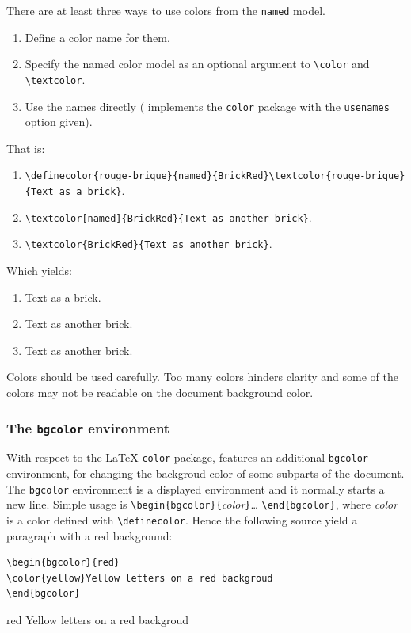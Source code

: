 There are at least three ways to use colors from the \texttt{named}
 model.
\begin{enumerate}
\item Define a color name for them.
\item Specify the named color model as an optional argument to
 \verb+\color+ and \verb+\textcolor+.
\item Use the names directly
(\hevea{} implements the \texttt{color} package with
the \texttt{usenames} option given).
\end{enumerate}
That is:
\begin{enumerate}
\item
\verb+\definecolor{rouge-brique}{named}{BrickRed}\textcolor{rouge-brique}{Text as a brick}+.
\item \verb+\textcolor[named]{BrickRed}{Text as another brick}+.
\item \verb+\textcolor{BrickRed}{Text as another brick}+.
\end{enumerate}
\ifhevea Which yields:
\begin{enumerate}
\item {}
\textcolor{rouge-brique}{Text as a brick}.
\item \textcolor[named]{BrickRed}{Text as another brick}.
\item \textcolor{BrickRed}{Text as another brick}.
\end{enumerate}\fi


Colors should be used carefully. Too many colors
hinders clarity and some of the colors may not be readable on the
document background color.

\subsubsection{The \texttt{bgcolor} environment}
\label{bgcolor}
With respect to the \LaTeX{} \texttt{color} package, \hevea{} features
an additional
\texttt{bgcolor} environment, for changing the backgroud color of some
subparts of the document.
The \texttt{bgcolor} environment is a displayed environment and it
normally starts a new line.
Simple usage is \verb+\begin{bgcolor}{+\textit{color}\verb+}+\ldots{}
\verb+\end{bgcolor}+, where
\textit{color} is a color defined with \verb+\definecolor+.
Hence the following source yield a paragraph with a red background:
\begin{verbatim}
\begin{bgcolor}{red}
\color{yellow}Yellow letters on a red backgroud
\end{bgcolor}
\end{verbatim}
\begin{htmlonly}
\begin{bgcolor}{red}
\color{yellow}Yellow letters on a red backgroud
\end{bgcolor}
\end{htmlonly}


